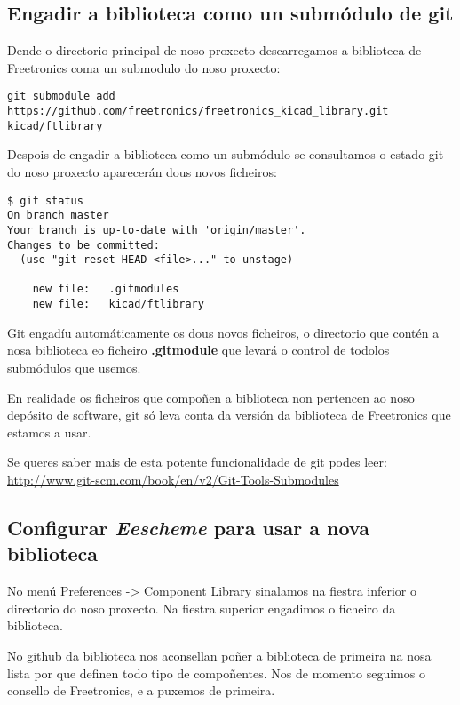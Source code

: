 \documentclass[12pt,galician,]{article}
\begin{document}
\subsection{Engadir a biblioteca como un submódulo de
git}\label{engadir-a-biblioteca-como-un-submuxf3dulo-de-git}

Dende o directorio principal de noso proxecto descarregamos a biblioteca
de Freetronics coma un submodulo do noso proxecto:

\begin{verbatim}
git submodule add https://github.com/freetronics/freetronics_kicad_library.git kicad/ftlibrary
\end{verbatim}

Despois de engadir a biblioteca como un submódulo se consultamos o
estado git do noso proxecto aparecerán dous novos ficheiros:

\begin{verbatim}
$ git status
On branch master
Your branch is up-to-date with 'origin/master'.
Changes to be committed:
  (use "git reset HEAD <file>..." to unstage)

    new file:   .gitmodules
    new file:   kicad/ftlibrary
\end{verbatim}

Git engadíu automáticamente os dous novos ficheiros, o directorio que
contén a nosa biblioteca eo ficheiro \textbf{.gitmodule} que levará o
control de todolos submódulos que usemos.

En realidade os ficheiros que compoñen a biblioteca non pertencen ao
noso depósito de software, git só leva conta da versión da biblioteca de
Freetronics que estamos a usar.

Se queres saber mais de esta potente funcionalidade de git podes leer:
\url{http://www.git-scm.com/book/en/v2/Git-Tools-Submodules}

\subsection{\texorpdfstring{Configurar \emph{Eescheme} para usar a nova
biblioteca}{Configurar Eescheme para usar a nova biblioteca}}\label{configurar-eescheme-para-usar-a-nova-biblioteca}

No menú Preferences -\textgreater{} Component Library sinalamos na
fiestra inferior o directorio do noso proxecto. Na fiestra superior
engadimos o ficheiro da biblioteca.

No github da biblioteca nos aconsellan poñer a biblioteca de primeira na
nosa lista por que definen todo tipo de compoñentes. Nos de momento
seguimos o consello de Freetronics, e a puxemos de primeira.
\end{document}
